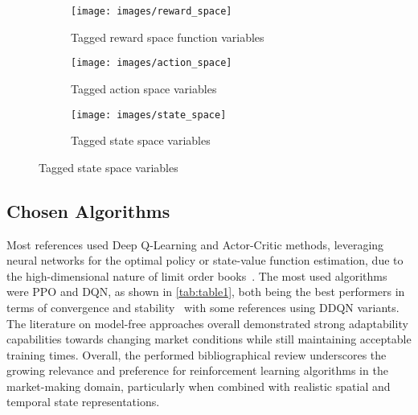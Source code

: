 \begin{figure}
    \centering
    \begin{subfigure}{.9\columnwidth}
        \centering
        \texttt{[image: images/reward\_space]}
        \caption{Tagged reward space function variables}
        \label{fig:reward}
    \end{subfigure}
    \vspace{0.5em}
    \begin{subfigure}{.9\columnwidth}
        \centering
        \texttt{[image: images/action\_space]}
        \caption{Tagged action space variables}
        \label{fig:action}
    \end{subfigure}
    \vspace{0.5em} %
    \begin{subfigure}{.9\columnwidth}
        \centering
        \texttt{[image: images/state\_space]}
        \caption{Tagged state space variables}
        \label{fig:state}
    \end{subfigure}
\end{figure}

\subsection{Chosen Algorithms}
\label{subsec:chosen-algorithms}
Most references used Deep Q-Learning and Actor-Critic methods, leveraging neural networks for the optimal policy or state-value function estimation,
due to the high-dimensional nature of limit order books~\cite{Patel2018, Ganesh2019}.
The most used algorithms were PPO and DQN, as shown in \autoref{tab:table1},
both being the best performers in terms of convergence and stability~\cite{Sun2022, Gasperov2021a} with some references using DDQN variants.
The literature on model-free approaches overall demonstrated strong adaptability capabilities towards changing market conditions
while still maintaining acceptable training times.
Overall, the performed bibliographical review underscores the growing relevance and preference for reinforcement learning algorithms in the market-making domain,
particularly when combined with realistic spatial and temporal state representations.

